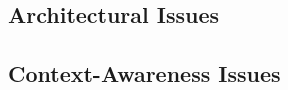 \subsection{Architectural Issues}
\citep{sanaei2014heterogeneity}

\subsection{Context-Awareness Issues}
\citep{sanaei2014heterogeneity}
\citep{fernando2013mobile}